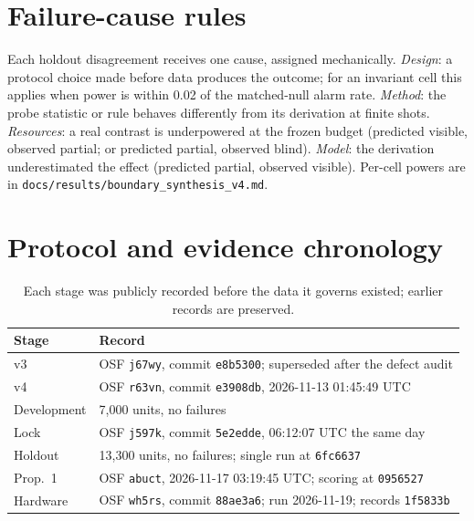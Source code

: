 \documentclass[10pt,twocolumn]{article}
\newcommand{\code}[1]{\texttt{#1}}
\begin{document}
\section{Failure-cause rules}\label{app:causes}

Each holdout disagreement receives one cause, assigned mechanically.
\emph{Design}: a protocol choice made before data produces the outcome; for an
invariant cell this applies when power is within 0.02 of the matched-null alarm
rate. \emph{Method}: the probe statistic or rule behaves differently from its
derivation at finite shots. \emph{Resources}: a real contrast is underpowered at
the frozen budget (predicted visible, observed partial; or predicted partial,
observed blind). \emph{Model}: the derivation underestimated the effect
(predicted partial, observed visible). Per-cell powers are in
\code{docs/results/boundary\_synthesis\_v4.md}.

\section{Protocol and evidence chronology}\label{app:chron}

\begin{table}[h]
\centering
\caption{Each stage was publicly recorded before the data it governs existed;
earlier records are preserved.}
\small
\begin{tabularx}{\columnwidth}{@{}lX@{}}
\toprule
Stage & Record \\
\midrule
v3 & OSF \code{j67wy}, commit \code{e8b5300}; superseded after the defect audit \\
v4 & OSF \code{r63vn}, commit \code{e3908db}, 2026-11-13 01:45:49 UTC \\
Development & 7,000 units, no failures \\
Lock & OSF \code{j597k}, commit \code{5e2edde}, 06:12:07 UTC the same day \\
Holdout & 13,300 units, no failures; single run at \code{6fc6637} \\
Prop.~1 & OSF \code{abuct}, 2026-11-17 03:19:45 UTC; scoring at \code{0956527} \\
Hardware & OSF \code{wh5rs}, commit \code{88ae3a6}; run 2026-11-19; records \code{1f5833b} \\
\bottomrule
\end{tabularx}
\end{table}
\end{document}
